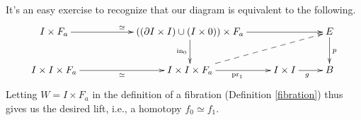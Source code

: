 %
%

It's an easy exercise to recognize that our diagram is equivalent to the following.
\begin{equation*}
    \xymatrix{
	I\times F_a\ar[rr]^{\simeq} & & ((\partial I\times I)\cup (I\times 0))\times F_a\ar[d]_{\mathrm{in}_0}\ar[rr] & & E\ar[d]^p\\
	I\times I\times F_a\ar[rr]_{\simeq} & & I\times I\times F_a\ar[r]_{\mathrm{pr}_1}\ar@{-->}[urr] & I\times I\ar[r]_g & B
    }
\end{equation*}
Letting $W=I\times F_a$ in the definition of a fibration (Definition \ref{fibration}) thus gives us the desired lift,
i.e., a homotopy $f_0\simeq f_1$.

